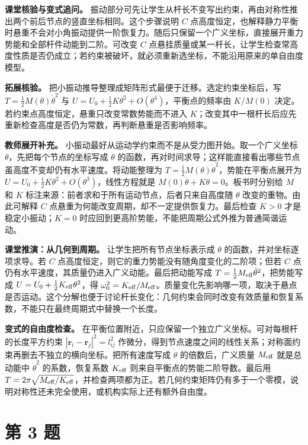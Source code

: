 \documentclass[12pt,a4paper,UTF8]{ctexart}
\begin{document}
\textbf{课堂核验与变式追问。}
振动部分可先让学生从杆长不变写出约束，再由对称性推出两个前后节点的竖直坐标相同。这个步骤说明
\(C\)
点高度恒定，也解释静力平衡时悬重不会对小角振动提供一阶恢复力。随后只保留一个广义坐标，直接展开重力势能和全部杆件动能到二阶。可改变
\(C\)
点悬挂质量或某一杆长，让学生检查常高度性质是否仍成立；若约束被破坏，就必须重新选坐标，不能沿用原来的单自由度模型。

\textbf{拓展核验。}
把小振动推导整理成矩阵形式最便于迁移。选定约束坐标后，写
\(T=\tfrac12M(\theta)\dot\theta^2\) 与
\(U=U_0+\tfrac12K\theta^2+O(\theta^4)\)，平衡点的频率由 \(K/M(0)\)
决定。若约束点高度恒定，悬重只改变常数势能而不进入
\(K\)；改变其中一根杆长后应先重新检查高度是否仍为常数，再判断悬重是否影响频率。

\textbf{教师展开补充。}
小振动最好从运动学约束而不是从受力图开始。取一个广义坐标
\(\theta\)，先把每个节点的坐标写成 \(\theta\)
的函数，再对时间求导；这样能直接看出哪些节点虽高度不变却仍有水平速度。将动能整理为
\(T=\tfrac12M(\theta)\dot\theta^2\)，势能在平衡点展开为
\(U=U_0+\tfrac12K\theta^2+O(\theta^3)\)，线性方程就是
\(M(0)\ddot\theta+K\theta=0\)。板书时分别给 \(M\) 和 \(K\)
标注来源：前者求和于所有运动节点，后者只来自高度随 \(\theta\)
改变的重物。由此可解释 \(C\)
点悬重为何能改变周期，却不一定提供恢复力。最后检查 \(K>0\)
才是稳定小振动；\(K=0\)
时应回到更高阶势能，不能把周期公式外推为普通简谐运动。

\textbf{课堂推演：从几何到周期。} 让学生把所有节点坐标表示成 \(\theta\)
的函数，并对坐标逐项求导。若 \(C\)
点高度恒定，则它的重力势能没有随角度变化的二阶项；但若 \(C\)
点仍有水平速度，其质量仍进入广义动能。最后把动能写成
\(T=\frac12 M_{\rm eff}\dot\theta^2\)，把势能写成
\(U=U_0+\frac12K_{\rm eff}\theta^2\)，得
\(\omega_0^2=K_{\rm eff}/M_{\rm eff}\)。质量变化先影响哪一项，取决于悬点是否运动。这个分解也便于讨论杆长变化：几何约束会同时改变有效质量和恢复系数，不能只在最终周期式中替换一个长度。

\textbf{变式的自由度检查。}
在平衡位置附近，只应保留一个独立广义坐标。可对每根杆的长度平方约束
\(|\boldsymbol r_i-\boldsymbol r_j|^2=l_{ij}^2\)
作微分，得到节点速度之间的线性关系；对称面约束再删去不独立的横向坐标。把所有速度写成
\(\dot\theta\) 的倍数后，广义质量 \(M_{\rm eff}\) 就是总动能中
\(\dot\theta^2\) 的系数，恢复系数 \(K_{\rm eff}\)
则来自平衡点的势能二阶导数。最后用
\(T=2\pi\sqrt{M_{\rm eff}/K_{\rm eff}}\)，并检查两项都为正。若几何约束矩阵仍有多于一个零模，说明对称性还未完全使用，或机构实际上还有额外自由度。

\newpage

\section{第 3 题}\label{ux7b2c-3-ux9898}
\end{document}
